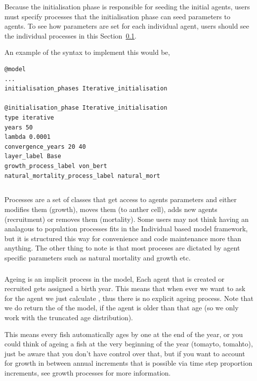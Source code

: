 Because the initialisation phase is responsible for seeding the initial agents, users must specify processes that the initialisation phase can seed parameters to agents. To see how parameters are set for each individual agent, users should see the individual processes in this Section~\ref{sec:process}.

An example of the syntax to implement this would be,
{\small{\begin{verbatim}
@model
...
initialisation_phases Iterative_initialisation

@initialisation_phase Iterative_initialisation
type iterative
years 50
lambda 0.0001
convergence_years 20 40
layer_label Base
growth_process_label von_bert
natural_mortality_process_label natural_mort
\end{verbatim}}}

\subsection{}\label{sec:process}
Processes are a set of classes that get access to agents parameters and either modifies them (growth), moves them (to anther cell), adds new agents (recruitment) or removes them (mortality). Some users may not think having an analagous to population processes fits in the Individual based model framework, but it is structured this way for convenience and code maintenance more than anything. The other thing to note is that most proceses are dictated by agent specific parameters such as natural mortality and growth etc.


\subsubsection{}
Ageing is an implicit process in the model, Each agent that is created or recruited gets assigned a birth year. This means that when ever we want to ask for the agent we just calculate , thus there is no explicit ageing process. Note that we do return the  of the model, if the agent is older than that age (so we only work with the truncated age distribution).


This means every fish automatically ages by one at the end of the year, or you could think of ageing a fish at the very beginning of the year (tomayto, tomahto), just be aware that you don't  have control over that, but if you want to account for growth in between annual increments that is possible via time step proportion increments, see growth processes for more information.

